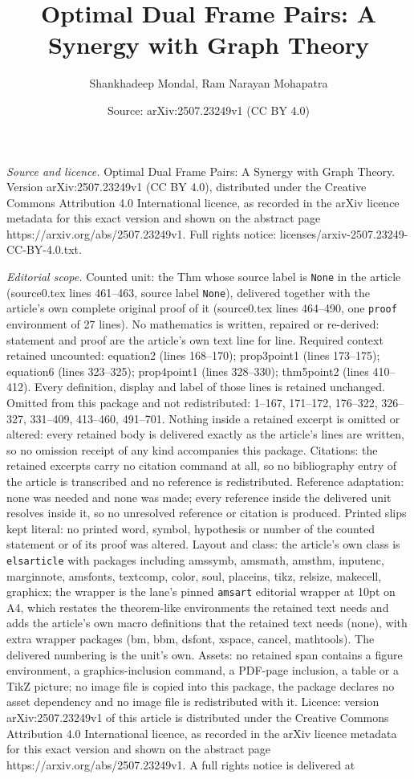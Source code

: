 \documentclass[10pt,a4paper]{amsart}
\title[Optimal Dual Frame Pairs: A Synergy with Graph Theory]{Optimal Dual Frame Pairs: A Synergy with Graph Theory}
\author{Shankhadeep Mondal, Ram Narayan Mohapatra}
\date{Source: arXiv:2507.23249v1 (CC BY 4.0)}
\begin{document}
\maketitle

\noindent\emph{Source and licence.} Optimal Dual Frame Pairs: A Synergy with Graph Theory. Version arXiv:2507.23249v1 (CC BY 4.0), distributed under the Creative Commons Attribution 4.0 International licence, as recorded in the arXiv licence metadata for this exact version and shown on the abstract page https://arxiv.org/abs/2507.23249v1. Full rights notice: licenses/arxiv-2507.23249-CC-BY-4.0.txt.\par\smallskip

\noindent\textit{Editorial scope.} Counted unit: the Thm whose source label is \texttt{None} in the article (source0.tex lines 461--463, source label \texttt{None}), delivered together with the article's own complete original proof of it (source0.tex lines 464--490, one \texttt{proof} environment of 27 lines). No mathematics is written, repaired or re-derived: statement and proof are the article's own text line for line. Required context retained uncounted: equation2 (lines 168--170); prop3point1 (lines 173--175); equation6 (lines 323--325); prop4point1 (lines 328--330); thm5point2 (lines 410--412). Every definition, display and label of those lines is retained unchanged. Omitted from this package and not redistributed: 1--167, 171--172, 176--322, 326--327, 331--409, 413--460, 491--701. Nothing inside a retained excerpt is omitted or altered: every retained body is delivered exactly as the article's lines are written, so no omission receipt of any kind accompanies this package. Citations: the retained excerpts carry no citation command at all, so no bibliography entry of the article is transcribed and no reference is redistributed. Reference adaptation: none was needed and none was made; every reference inside the delivered unit resolves inside it, so no unresolved reference or citation is produced. Printed slips kept literal: no printed word, symbol, hypothesis or number of the counted statement or of its proof was altered. Layout and class: the article's own class is \texttt{elsarticle} with packages including amssymb, amsmath, amsthm, inputenc, marginnote, amsfonts, textcomp, color, soul, placeins, tikz, relsize, makecell, graphicx; the wrapper is the lane's pinned \texttt{amsart} editorial wrapper at 10pt on A4, which restates the theorem-like environments the retained text needs and adds the article's own macro definitions that the retained text needs (none), with extra wrapper packages (bm, bbm, dsfont, xspace, cancel, mathtools). The delivered numbering is the unit's own. Assets: no retained span contains a figure environment, a graphics-inclusion command, a PDF-page inclusion, a table or a TikZ picture; no image file is copied into this package, the package declares no asset dependency and no image file is redistributed with it. Licence: version arXiv:2507.23249v1 of this article is distributed under the Creative Commons Attribution 4.0 International licence, as recorded in the arXiv licence metadata for this exact version and shown on the abstract page https://arxiv.org/abs/2507.23249v1. A full rights notice is delivered at 
\end{document}
